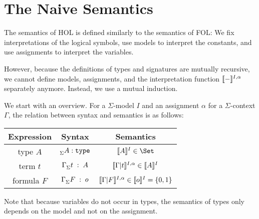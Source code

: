 \section{The Naive Semantics}

The semantics of HOL is defined similarly to the semantics of FOL: We fix interpretations of the logical symbols, use models to interpret the constants, and use assignments to interpret the variables.

However, because the definitions of types and signatures are mutually recursive, we cannot define models, assignments, and the interpretation function $\llbracket -\rrbracket^{I,\alpha}$ separately anymore. Instead, we use a mutual induction.

We start with an overview. For a $\Sigma$-model $I$ and an assignment $\alpha$ for a $\Sigma$-context $\Gamma$, the relation between syntax and semantics is as follows:
\begin{center}
\begin{tabular}{|c|c|c|}
\hline
Expression          & Syntax                           & Semantics \\ \hline
type $A$            & $^{}_{\Sigma}A:\mathtt{type}$             & $\semm{A}{I}\in \Set$ \\
term $t$            & $\Gamma^{}_{\Sigma}t\;:\;A$  & $\llbracket \Gamma|t\rrbracket^{I,\alpha}\in \llbracket A\rrbracket^{I}$ \\
formula $F$         & $\Gamma^{}_{\Sigma}F\;:\;o$  & $\llbracket \Gamma|F\rrbracket^{I,\alpha}\in \llbracket o\rrbracket^{I}=\{0,1\}$ \\
\hline
\end{tabular}
\end{center}

Note that because variables do not occur in types, the semantics of types only depends on the model and not on the assignment.

